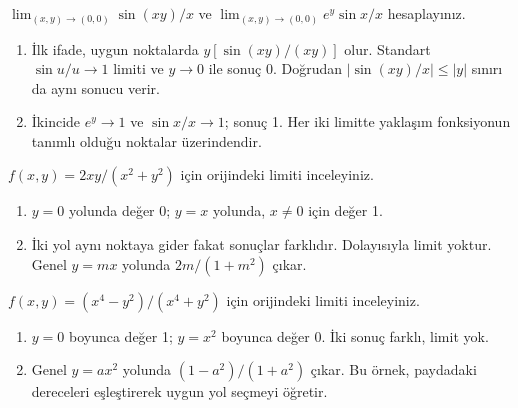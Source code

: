 \begin{tcolorbox}[title={Örnek 4.9 | Sinüs içeren limitler},colframe=accent]\(\lim_{(x,y)\to(0,0)}\sin(xy)/x\) ve \(\lim_{(x,y)\to(0,0)}e^y\sin x/x\) hesaplayınız.
\par{}\end{tcolorbox}
\begin{tcolorbox}[title={Adım adım çözüm},colback=green!3!white,colframe=green]\begin{enumerate}
\item İlk ifade, uygun noktalarda \(y[\sin(xy)/(xy)]\) olur. Standart \(\sin u/u\to1\) limiti ve \(y\to0\) ile sonuç 0. Doğrudan \(|\sin(xy)/x|\le|y|\) sınırı da aynı sonucu verir.
\item İkincide \(e^y\to1\) ve \(\sin x/x\to1\); sonuç 1. Her iki limitte yaklaşım fonksiyonun tanımlı olduğu noktalar üzerindendir.
\end{enumerate}\end{tcolorbox}
\begin{tcolorbox}[title={Örnek 4.10 | Doğruya bağlı sonuç},colframe=accent]\(f(x,y)=2xy/(x^2+y^2)\) için orijindeki limiti inceleyiniz.
\par{}\end{tcolorbox}
\begin{tcolorbox}[title={Adım adım çözüm},colback=green!3!white,colframe=green]\begin{enumerate}
\item \(y=0\) yolunda değer 0; \(y=x\) yolunda, \(x\ne0\) için değer 1.
\item İki yol aynı noktaya gider fakat sonuçlar farklıdır. Dolayısıyla limit yoktur. Genel \(y=mx\) yolunda \(2m/(1+m^2)\) çıkar.
\end{enumerate}\end{tcolorbox}
\begin{tcolorbox}[title={Örnek 4.11 | Parabol yoluyla limitin yokluğu},colframe=accent]\(f(x,y)=(x^4-y^2)/(x^4+y^2)\) için orijindeki limiti inceleyiniz.
\par{}\end{tcolorbox}
\begin{tcolorbox}[title={Adım adım çözüm},colback=green!3!white,colframe=green]\begin{enumerate}
\item \(y=0\) boyunca değer 1; \(y=x^2\) boyunca değer 0. İki sonuç farklı, limit yok.
\item Genel \(y=ax^2\) yolunda \((1-a^2)/(1+a^2)\) çıkar. Bu örnek, paydadaki dereceleri eşleştirerek uygun yol seçmeyi öğretir.
\end{enumerate}\end{tcolorbox}
